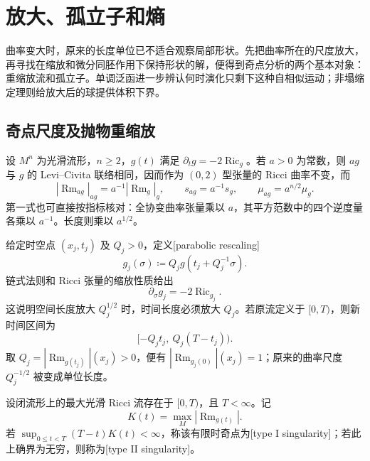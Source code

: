 
% 
% 

\section{放大、孤立子和熵}
\label{g3:sec:2704}

曲率变大时，原来的长度单位已不适合观察局部形状。先把曲率所在的尺度放大，再寻找在缩放和微分同胚作用下保持形状的解，便得到奇点分析的两个基本对象：重缩放流和孤立子。单调泛函进一步辨认何时演化只剩下这种自相似运动；非塌缩定理则给放大后的球提供体积下界。

\subsection{奇点尺度及抛物重缩放}
\label{g3:subsec:2704:01}
设 \(M^n\) 为光滑流形，\(n\ge2\)，\(g(t)\) 满足 \(\partial_tg=-2\operatorname{Ric}_g\)。若 \(a>0\) 为常数，则 \(ag\) 与 \(g\) 的 Levi--Civita 联络相同，因而作为 \((0,2)\) 型张量的 Ricci 曲率不变，而
\begin{equation}\label{g3:eq:ricci-constant-scaling}
	|\operatorname{Rm}_{ag}|_{ag}=a^{-1}|\operatorname{Rm}_g|_g,
	\qquad s_{ag}=a^{-1}s_g,
	\qquad \mu_{ag}=a^{n/2}\mu_g.
\end{equation}
第一式也可直接按指标核对：全协变曲率张量乘以 \(a\)，其平方范数中的四个逆度量各乘以 \(a^{-1}\)。长度则乘以 \(a^{1/2}\)。

\ProseParagraphBreak
给定时空点 \((x_j,t_j)\) 及 \(Q_j>0\)，定义[parabolic rescaling]
\begin{equation}\label{g3:eq:ricci-parabolic-rescaling}
	g_j(\sigma)\coloneqq Q_jg(t_j+Q_j^{-1}\sigma).
\end{equation}
链式法则和 Ricci 张量的缩放性质给出
\[
	\partial_\sigma g_j=-2\operatorname{Ric}_{g_j}.
\]
这说明空间长度放大 \(Q_j^{1/2}\) 时，时间长度必须放大 \(Q_j\)。若原流定义于 \([0,T)\)，则新时间区间为
\[
	[-Q_jt_j,\ Q_j(T-t_j)).
\]
取 \(Q_j=|\operatorname{Rm}_{g(t_j)}|(x_j)>0\)，便有 \(|\operatorname{Rm}_{g_j(0)}|(x_j)=1\)；原来的曲率尺度 \(Q_j^{-1/2}\) 被变成单位长度。

\begin{definition}\label{g3:def:ricci-singularity-types}
	设闭流形上的最大光滑 Ricci 流存在于 \([0,T)\)，且 \(T<\infty\)。记
	\[
		K(t)=\max_M|\operatorname{Rm}_{g(t)}|.
	\]
	若 \(\sup_{0\le t<T}(T-t)K(t)<\infty\)，称该有限时奇点为[type I singularity]；若此上确界为无穷，则称为[type II singularity]。
\end{definition}

